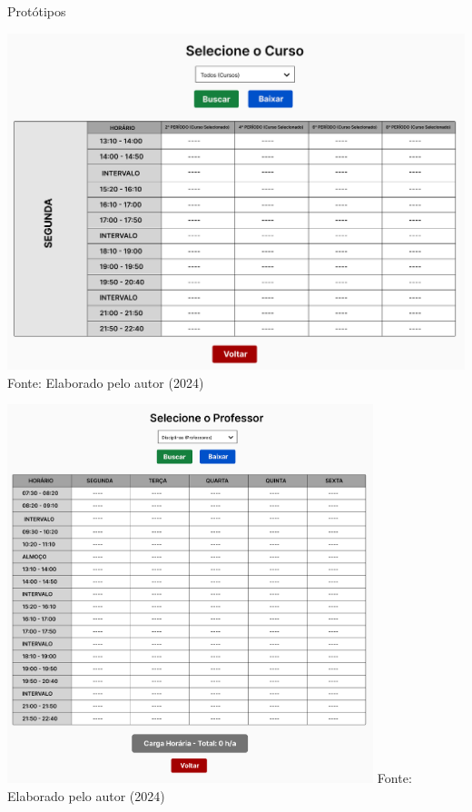\begin{frame}{Protótipos}
    \begin{minipage}{0.48\textwidth}
        \centering
        \includegraphics[width=1\textwidth]{figuras/proto-3.png}
        \small Fonte: Elaborado pelo autor (2024)
    \end{minipage}
    \hfill
    \begin{minipage}{0.48\textwidth}
        \centering
        \includegraphics[width=0.8\textwidth]{figuras/proto-4.png}
        \small Fonte: Elaborado pelo autor (2024)
    \end{minipage}
\end{frame}

